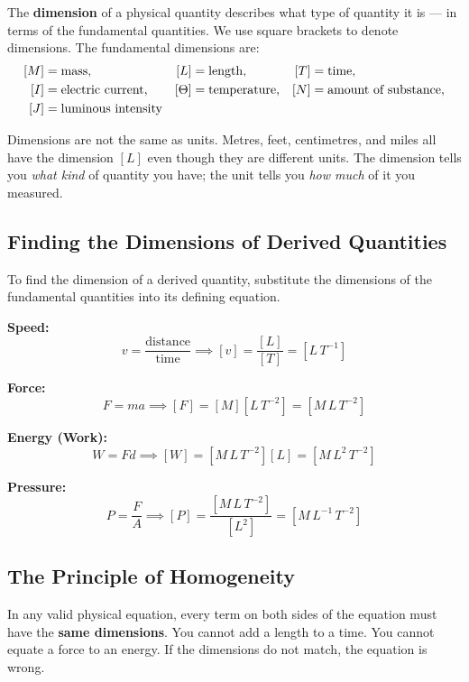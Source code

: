 \begin{definitionbox}[Dimension]
The \textbf{dimension} of a physical quantity describes what
type of quantity it is --- in terms of the fundamental quantities.
We use square brackets to denote dimensions. The fundamental
dimensions are:
\[
\begin{aligned}
  \relax[M] &= \text{mass}, & [L] &= \text{length}, & [T] &= \text{time},\\
  [I] &= \text{electric current}, & [\Theta] &= \text{temperature}, & [N] &= \text{amount of substance},\\
  [J] &= \text{luminous intensity}
\end{aligned}
\]
\end{definitionbox}

Dimensions are not the same as units. Metres, feet,
centimetres, and miles all have the dimension $[L]$ even
though they are different units. The dimension tells you
\textit{what kind} of quantity you have; the unit tells you
\textit{how much} of it you measured.

\subsection{Finding the Dimensions of Derived Quantities}

To find the dimension of a derived quantity, substitute the
dimensions of the fundamental quantities into its defining equation.

\vspace{0.3cm}

\textbf{Speed:}
\[
  v = \frac{\text{distance}}{\text{time}}
  \implies [v] = \frac{[L]}{[T]} = [L\,T^{-1}]
\]

\textbf{Force:}
\[
  F = ma
  \implies [F] = [M][L\,T^{-2}] = [M\,L\,T^{-2}]
\]

\textbf{Energy (Work):}
\[
  W = Fd
  \implies [W] = [M\,L\,T^{-2}][L] = [M\,L^2\,T^{-2}]
\]

\textbf{Pressure:}
\[
  P = \frac{F}{A}
  \implies [P] = \frac{[M\,L\,T^{-2}]}{[L^2]}
  = [M\,L^{-1}\,T^{-2}]
\]

\subsection{The Principle of Homogeneity}

\begin{lawbox}
In any valid physical equation, every term on both sides
of the equation must have the \textbf{same dimensions}.
You cannot add a length to a time. You cannot equate a
force to an energy. If the dimensions do not match, the
equation is wrong.
\end{lawbox}

